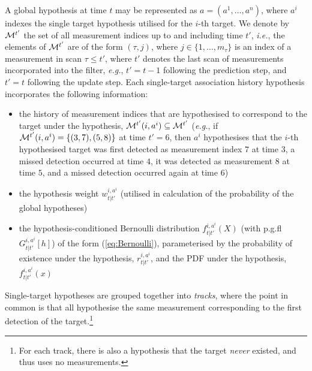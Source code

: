 \documentclass[journal,twoside]{IEEEtran}
\theoremstyle{plain}
\begin{document}
A global hypothesis at time $t$ may be represented as $a=(a^1,\dots,a^n)$, where $a^i$ indexes the single target hypothesis utilised for the $i$-th target. We denote by ${\cal M}^{t'}$ the set of all measurement indices up to and including time $t'$, \textit{i.e.}\xspace, the elements of ${\cal M}^{t'}$ are of the form $(\tau,j)$, where $j\in\{1,\dots,m_{\tau}\}$ is an index of a measurement in scan $\tau\leq t'$, where $t'$ denotes the last scan of measurements incorporated into the filter, \textit{e.g.}\xspace, $t'=t-1$ following the prediction step, and $t'=t$ following the update step. Each single-target association history hypothesis incorporates the following information:
%
\begin{itemize}
\item the history of measurement indices that are hypothesised to correspond to the target under the hypothesis, ${\cal M}^{t'}(i,a^i)\subseteq{\cal M}^{t'}$ (\textit{e.g.}\xspace, if ${\cal M}^{t'}(i,a^i)=\{(3,7),(5,8)\}$ at time $t'=6$, then $a^i$ hypothesises that the $i$-th hypothesised target was first detected as measurement index $7$ at time $3$, a missed detection occurred at time $4$, it was detected as measurement $8$ at time $5$, and a missed detection occurred again at time $6$)
\item the hypothesis weight $w_{t|t'}^{i,a^i}$ (utilised in calculation of the probability of the global hypotheses)
\item the hypothesis-conditioned Bernoulli distribution $f_{t|t'}^{i,a^i}(X)$ (with p.g.fl $G_{t|t'}^{i,a^i}[h]$) of the form (\ref{eq:Bernoulli}), parameterised by the probability of existence under the hypothesis, $r_{t|t'}^{i,a^i}$, and the PDF under the hypothesis, $f_{t|t'}^{i,a^i}(x)$
\end{itemize}

Single-target hypotheses are grouped together into \emph{tracks}, where the point in common is that all hypothesise the same measurement corresponding to the first detection of the target.\footnote{For each track, there is also a hypothesis that the target \emph{never} existed, and thus uses no measurements.}
\end{document}
